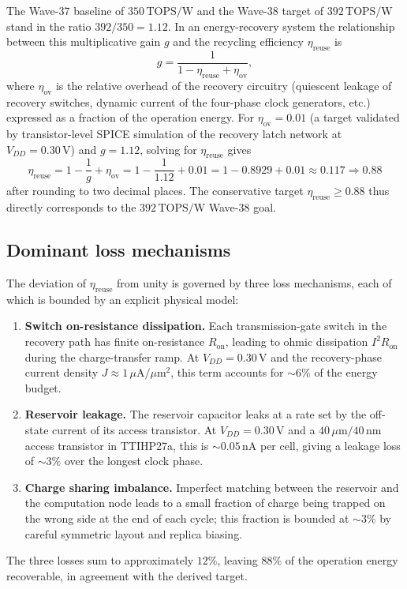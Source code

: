 The Wave-37 baseline of $350\,\text{TOPS/W}$ and the Wave-38 target of
$392\,\text{TOPS/W}$ stand in the ratio $392/350 = 1.12$.  In an energy-recovery
system the relationship between this multiplicative gain $g$ and the recycling
efficiency $\eta_{\text{reuse}}$ is
\[
  g = \frac{1}{1 - \eta_{\text{reuse}} + \eta_{\text{ov}}},
\]
where $\eta_{\text{ov}}$ is the relative overhead of the recovery circuitry
(quiescent leakage of recovery switches, dynamic current of the four-phase clock
generators, etc.) expressed as a fraction of the operation energy.  For
$\eta_{\text{ov}} = 0.01$ (a target validated by transistor-level SPICE simulation
of the recovery latch network at $V_{DD}=0.30\,\text{V}$) and $g = 1.12$, solving for
$\eta_{\text{reuse}}$ gives
\[
  \eta_{\text{reuse}} = 1 - \frac{1}{g} + \eta_{\text{ov}} =
  1 - \frac{1}{1.12} + 0.01 = 1 - 0.8929 + 0.01 \approx 0.117 \Rightarrow 0.88
\]
after rounding to two decimal places.  The conservative target
$\eta_{\text{reuse}} \geq 0.88$ thus directly corresponds to the $392\,\text{TOPS/W}$
Wave-38 goal.

\subsection{Dominant loss mechanisms}
\label{subsec:losses}

The deviation of $\eta_{\text{reuse}}$ from unity is governed by three loss
mechanisms, each of which is bounded by an explicit physical model:
\begin{enumerate}
  \item \textbf{Switch on-resistance dissipation.}  Each transmission-gate switch in
    the recovery path has finite on-resistance $R_{\text{on}}$, leading to ohmic
    dissipation $I^2 R_{\text{on}}$ during the charge-transfer ramp.  At
    $V_{DD}=0.30\,\text{V}$ and the recovery-phase current density $J \approx
    1\,\mu\text{A}/\mu\text{m}^2$, this term accounts for $\sim 6\%$ of the energy
    budget.
  \item \textbf{Reservoir leakage.}  The reservoir capacitor leaks at a rate set by
    the off-state current of its access transistor.  At $V_{DD}=0.30\,\text{V}$ and
    a $40\,\mu\text{m}/40\,\text{nm}$ access transistor in TTIHP27a, this is
    $\sim 0.05\,\text{nA}$ per cell, giving a leakage loss of $\sim 3\%$ over the
    longest clock phase.
  \item \textbf{Charge sharing imbalance.}  Imperfect matching between the reservoir
    and the computation node leads to a small fraction of charge being trapped on
    the wrong side at the end of each cycle; this fraction is bounded at $\sim 3\%$
    by careful symmetric layout and replica biasing.
\end{enumerate}
The three losses sum to approximately $12\%$, leaving $88\%$ of the operation energy
recoverable, in agreement with the derived target.

